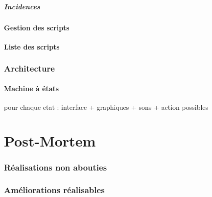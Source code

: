 \documentclass[a4paper]{article}
\begin{document}
			\subsubsection{Incidences}
			
		\subsection{Gestion des scripts}
		
		\subsection{Liste des scripts}
		
	\section{Architecture}
	
		\subsection{Machine à états}
			pour chaque etat :
			interface + graphiques + sons + action possibles
	

  \newpage
  \part{Post-Mortem}
  
	\section{Réalisations non abouties}
	
	\section{Améliorations réalisables}
	
\end{document}
